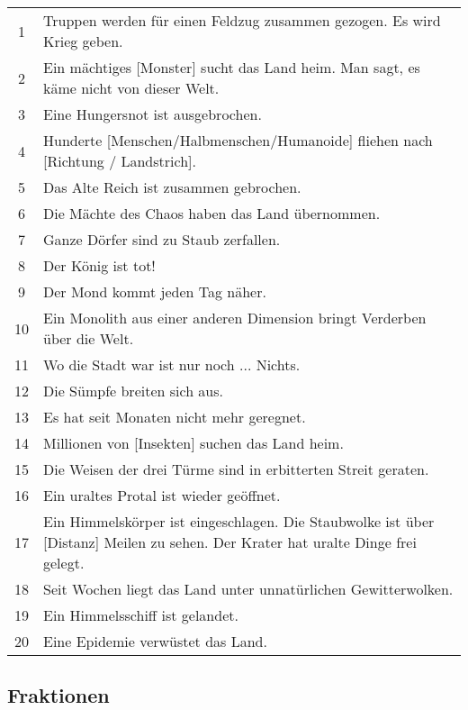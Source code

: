 \documentclass[11pt]{wbzine}
\begin{document}
\begin{tabularx}{\columnwidth}{cZ}
1 & Truppen werden für einen Feldzug zusammen gezogen. Es wird Krieg
geben.\\
2 & Ein mächtiges [Monster] sucht das Land heim. Man sagt, es käme
nicht von dieser Welt.\\
3 & Eine Hungersnot ist ausgebrochen.\\
4 & Hunderte [Menschen/Halbmenschen/Humanoide] fliehen nach
[Richtung / Landstrich].\\
5 & Das Alte Reich ist zusammen gebrochen.\\
6 & Die Mächte des Chaos haben das Land übernommen.\\
7 & Ganze Dörfer sind zu Staub zerfallen.\\
8 & Der König ist tot!\\
9 & Der Mond kommt jeden Tag näher.\\
10 & Ein Monolith aus einer anderen Dimension bringt Verderben über
die Welt.\\
11 & Wo die Stadt war ist nur noch ... Nichts.\\
12 & Die Sümpfe breiten sich aus.\\
13 & Es hat seit Monaten nicht mehr geregnet.\\
14 & Millionen von [Insekten] suchen das Land heim.\\
15 & Die Weisen der drei Türme sind in erbitterten Streit geraten.\\
16 & Ein uraltes Protal ist wieder geöffnet.\\
17 & Ein Himmelskörper ist eingeschlagen. Die Staubwolke ist über [Distanz] Meilen zu
sehen. Der Krater hat uralte Dinge frei gelegt.\\
18 & Seit Wochen liegt das Land unter unnatürlichen
Gewitterwolken.\\
19 & Ein Himmelsschiff ist gelandet.\\
20 & Eine Epidemie verwüstet das Land.\\
\end{tabularx}

\subsection{Fraktionen}
\end{document}
